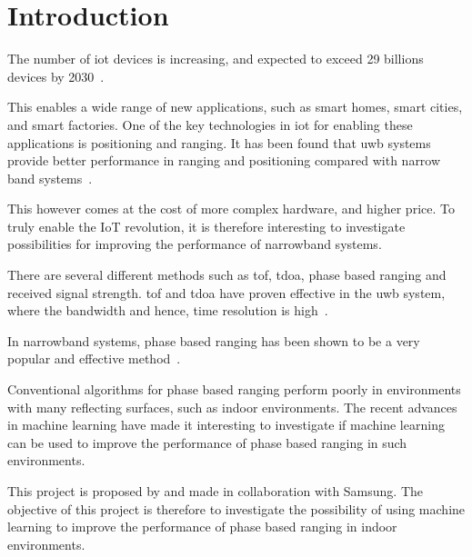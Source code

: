 \chapter{Introduction}\label{ch:introduction}
The number of \ac{iot} devices is increasing, and expected to exceed 29 billions devices by 2030~\cite{IoTDevices}.

This enables a wide range of new applications, such as smart homes, smart cities, and smart factories.
One of the key technologies in \ac{iot} for enabling these applications is positioning and ranging.
It has been found that \ac{uwb} systems provide better performance in ranging and positioning compared with narrow band systems~\cite{Lu2021}.

This however comes at the cost of more complex hardware, and higher price.
To truly enable the IoT revolution, it is therefore interesting to investigate possibilities for improving the performance of narrowband systems.

There are several different methods such as \ac{tof}, \ac{tdoa}, phase based ranging and received signal strength.
\ac{tof} and \ac{tdoa} have proven effective in the \ac{uwb} system, where the bandwidth
and hence, time resolution is high~\cite{Shen2010}.


In narrowband systems, phase based ranging has been shown to be a very popular and effective method~\cite{Kluge2013,Zand2019}.


Conventional algorithms for phase based ranging perform poorly in environments with many reflecting surfaces, such as indoor environments.
The recent advances in machine learning have made it interesting to investigate if machine learning can be used to improve the performance of phase based ranging in such environments.

This project is proposed by and made in collaboration with Samsung.
The objective of this project is therefore to investigate the possibility of using machine learning to improve the performance of phase based ranging in indoor environments.